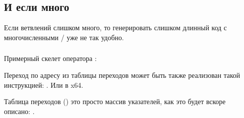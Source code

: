 \subsection{И если много}

Если ветвлений слишком много, то генерировать слишком длинный код с многочисленными \JE/\JNE 
уже не так удобно.







\subsubsection{\Conclusion{}}

Примерный скелет оператора :



Переход по адресу из таблицы переходов может быть также реализован такой инструкцией: .
Или  в x64.

Таблица переходов () это просто массив указателей, как это будет вскоре описано: .

